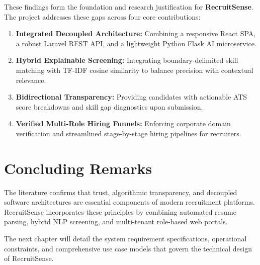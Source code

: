 These findings form the foundation and research justification for \textbf{RecruitSense}. The project addresses these gaps across four core contributions:
\begin{enumerate}
    \item \textbf{Integrated Decoupled Architecture:} Combining a responsive React SPA, a robust Laravel REST API, and a lightweight Python Flask AI microservice.
    \item \textbf{Hybrid Explainable Screening:} Integrating boundary-delimited skill matching with TF-IDF cosine similarity to balance precision with contextual relevance.
    \item \textbf{Bidirectional Transparency:} Providing candidates with actionable ATS score breakdowns and skill gap diagnostics upon submission.
    \item \textbf{Verified Multi-Role Hiring Funnels:} Enforcing corporate domain verification and streamlined stage-by-stage hiring pipelines for recruiters.
\end{enumerate}

\section{Concluding Remarks}
The literature confirms that trust, algorithmic transparency, and decoupled software architectures are essential components of modern recruitment platforms. RecruitSense incorporates these principles by combining automated resume parsing, hybrid NLP screening, and multi-tenant role-based web portals. 

The next chapter will detail the system requirement specifications, operational constraints, and comprehensive use case models that govern the technical design of RecruitSense.
